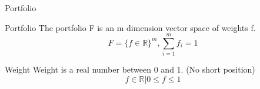 \begin{frame}{Portfolio}
\begin{block}{Portfolio}
The portfolio F is an m dimension vector space of weights f.
\[
    F = \{ {f \in \mathbb{R} } \} ^m,
    \sum_{i=1}^m {f_i} =1
\]
\end{block}
\begin{block}{Weight}
Weight is a real number between 0 and 1. \alert{(No short position)}
\[
    f \in \mathbb{R} | 0 \leq f \leq 1 
\]
\end{block}
\end{frame}
